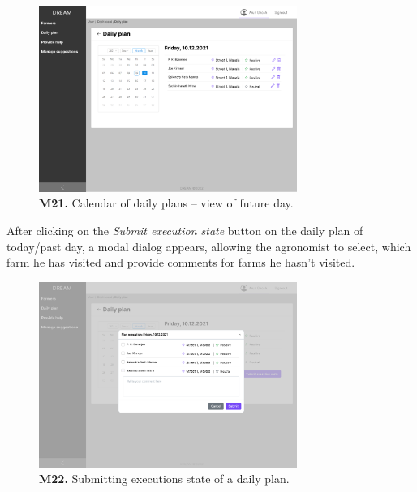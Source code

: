 \begin{figure}[H]
    \centering
    \includegraphics[width=0.75\textwidth]{mockups/Agronomist_Dashboard_Visit plan in future.png}
    \caption{\textbf{M21.} Calendar of daily plans – view of future day.}
\end{figure}

After clicking on the \textit{Submit execution state} button on the daily plan of today/past day, a modal dialog appears, allowing the agronomist to select, which farm he has visited and provide comments for farms he hasn't visited.
\begin{figure}[H]
    \centering
    \includegraphics[width=0.75\textwidth]{mockups/Agronomist_Dashboard_Visit plan_Submit.png}
    \caption{\textbf{M22.} Submitting executions state of a daily plan.}
\end{figure}

